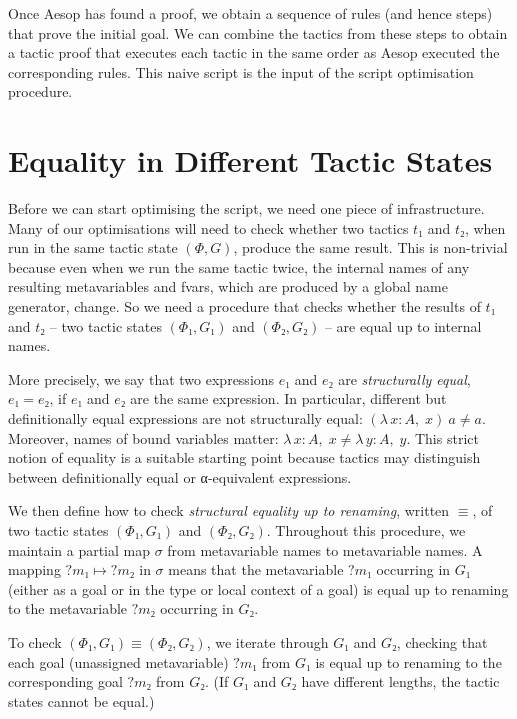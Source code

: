 \documentclass[sigplan,screen]{acmart}
\newcommand{\Lam}[2]{λ\,#1,\; #2}
\newcommand{\mvar}[1]{{?#1}}
\begin{document}
\medskip

Once Aesop has found a proof, we obtain a sequence of rules (and hence steps) that prove the initial goal.
We can combine the tactics from these steps to obtain a tactic proof that executes each tactic in the same order as Aesop executed the corresponding rules.
This naive script is the input of the script optimisation procedure.

\section{Equality in Different Tactic States}%
\label{sec:equality}

Before we can start optimising the script, we need one piece of infrastructure.
Many of our optimisations will need to check whether two tactics $t₁$ and $t₂$, when run in the same tactic state $(Φ, G)$, produce the same result.
This is non-trivial because even when we run the same tactic twice, the internal names of any resulting metavariables and fvars, which are produced by a global name generator, change.
So we need a procedure that checks whether the results of $t₁$ and $t₂$ -- two tactic states $(Φ₁, G₁)$ and $(Φ₂, G₂)$ -- are equal up to internal names.

More precisely, we say that two expressions $e₁$ and $e₂$ are \emph{structurally equal}, $e₁ = e₂$, if $e₁$ and $e₂$ are the same expression.
In particular, different but definitionally equal expressions are not structurally equal: $(\Lam{x : A}{x})~a ≠ a$.
Moreover, names of bound variables matter: $\Lam{x : A}{x} ≠ \Lam{y : A}{y}$.
This strict notion of equality is a suitable starting point because tactics may distinguish between definitionally equal or α-equivalent expressions.

We then define how to check \emph{structural equality up to renaming}, written $≡$, of two tactic states $(Φ₁, G₁)$ and $(Φ₂, G₂)$.
Throughout this procedure, we maintain a partial map $σ$ from metavariable names to metavariable names.
A mapping $\mvar{m₁} ↦ \mvar{m₂}$ in $σ$ means that the metavariable $\mvar{m₁}$ occurring in $G₁$ (either as a goal or in the type or local context of a goal) is equal up to renaming to the metavariable $\mvar{m₂}$ occurring in $G₂$.

To check $(Φ₁, G₁) ≡ (Φ₂, G₂)$, we iterate through $G₁$ and $G₂$, checking that each goal (unassigned metavariable) $\mvar{m₁}$ from $G₁$ is equal up to renaming to the corresponding goal $\mvar{m₂}$ from $G₂$.
(If $G₁$ and $G₂$ have different lengths, the tactic states cannot be equal.)
\end{document}
